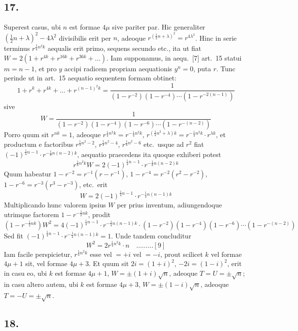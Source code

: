 \documentclass[12pt,a4paper]{article}
\theoremstyle{plain}
\begin{document}
\subsection*{17.}

Superest casus, ubi $n$ est formae $4\mu$ sive pariter par. Hic generaliter $(\frac{1}{2}n+\lambda)^2 - 4\lambda^2$ divisibilis erit per $n$, adeoque $r^{(\frac{1}{2}n+\lambda)^2} = r^{4\lambda^2}$. Hinc in serie terminus $r^{\frac{1}{4}n^2 k}$ aequalis erit primo, sequens secundo etc., ita ut fiat $W = 2(1 + r^{4k} + r^{16k} + r^{36k} + \ldots)$. Iam supponamus, in aequ.\ [7] art.\ 15 statui $m = n-1$, et pro $y$ accipi radicem propriam aequationis $y^n = 0$, puta $r$. Tunc perinde ut in art.\ 15 aequatio sequentem formam obtinet:
\[
1 + r^{k} + r^{4k} + \ldots + r^{(n-1)^2 k} = \frac{1}{(1-r^{-2})(1-r^{-4}) \cdots (1-r^{-2(n-1)})}
\]
sive
\[
W = \frac{1}{(1-r^{-2})(1-r^{-4})(1-r^{-6}) \cdots (1-r^{-(n-2)})}
\]
Porro quum sit $r^{nk} = 1$, adeoque $r^{\frac{1}{4}n^2 k} = r^{-\frac{1}{4}n^2 k}$, $r^{(\frac{1}{4}n^2+\lambda)k} = r^{-\frac{1}{4}n^2 k} \cdot r^{\lambda k}$, et productum e factoribus $r^{\frac{1}{4}n^2 - 2}$, $r^{\frac{1}{4}n^2 - 4}$, $r^{\frac{1}{4}n^2 - 6}$ etc.\ usque ad $r^2$ fiat $(-1)^{\frac{1}{4}n-1} \cdot r^{-\frac{1}{8}n(n-2)k}$, aequatio praecedens ita quoque exhiberi potest
\[
r^{\frac{1}{8}n^2 k} W = 2(-1)^{\frac{1}{4}n-1} \cdot r^{-\frac{1}{8}n(n-2)k}
\]
Quum habeatur $1 - r^{-2} = r^{-1}(r - r^{-1})$, $1 - r^{-4} = r^{-2}(r^2 - r^{-2})$, $1 - r^{-6} = r^{-3}(r^3 - r^{-3})$, etc.\ erit
\[
W = 2(-1)^{\frac{1}{4}n-1} \cdot r^{-\frac{1}{4}n(n-1)k}
\]
Multiplicando hunc valorem ipsius $W$ per prius inventum, adiungendoque utrimque factorem $1 - r^{-\frac{1}{2}nk}$, prodit
\[
(1 - r^{-\frac{1}{2}nk}) W^2 = 4(-1)^{\frac{1}{4}n-1} \cdot r^{-\frac{1}{4}n(n-1)k} \cdot (1 - r^{-2})(1 - r^{-4})(1 - r^{-6}) \cdots (1 - r^{-(n-2)})
\]
Sed fit $(-1)^{\frac{1}{4}n-1} \cdot r^{-\frac{1}{4}n(n-1)k} = 1$. Unde tandem concluditur
\[
W^2 = 2r^{\frac{1}{4}n^2 k} \cdot n \quad \ldots \ldots \ldots [9]
\]
Iam facile perspicietur, $r^{\frac{1}{4}n^2 k}$ esse vel $= +i$ vel $= -i$, prout scilicet $k$ vel formae $4\mu+1$ sit, vel formae $4\mu+3$. Et quum sit $2i = (1+i)^2$, $-2i = (1-i)^2$, erit in casu eo, ubi $k$ est formae $4\mu+1$, $W = \pm(1+i)\sqrt{n}$, adeoque $T = U = \pm\sqrt{n}$; in casu altero autem, ubi $k$ est formae $4\mu+3$, $W = \pm(1-i)\sqrt{n}$, adeoque $T = -U = \pm\sqrt{n}$.

\subsection*{18.}
\end{document}
